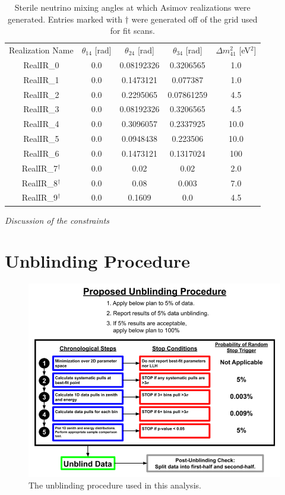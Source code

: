 \documentclass[main.tex]{subfiles}
\begin{document}
\begin{table}
    \centering
    \begin{tabular}{c | cccc}\rowcolor{blue!25}
            Realization Name & $\theta_{14}$ [rad] & $\theta_{24}$ [rad] & $\theta_{34}$ [rad] & $\Delta m_{41}^{2}$ [eV$^{2}$] \\
            RealIR\_0& 0.0  & 0.08192326 & 0.3206565 & 1.0 \\
            RealIR\_1& 0.0  & 0.1473121 & 0.077387 & 1.0\\
            RealIR\_2& 0.0  & 0.2295065 & 0.07861259 & 4.5\\
            RealIR\_3& 0.0  & 0.08192326 & 0.3206565 & 4.5\\
            RealIR\_4& 0.0  & 0.3096057 & 0.2337925 & 10.0\\
            RealIR\_5& 0.0  & 0.0948438 & 0.223506 & 10.0\\
            RealIR\_6& 0.0  & 0.1473121 & 0.1317024 & 100\\
            RealIR\_7$^{\dag}$ & 0.0  & 0.02 & 0.02 & 2.0\\
            RealIR\_8$^{\dag}$ & 0.0  & 0.08 & 0.003 & 7.0\\
            RealIR\_9$^{\dag}$ & 0.0  & 0.1609 & 0.0 & 4.5
    \end{tabular}
    \caption{Sterile neutrino mixing angles at which Asimov realizations were generated. Entries marked with $\dag$ were generated off of the grid used for fit scans.}\label{table:injected_signals}
\end{table}


\textit{Discussion of the constraints}

\section{Unblinding Procedure}

\begin{figure}
    \centering
    \includegraphics[width=0.7\linewidth]{figures/Proposed_unblinding_plan.jpg.png}
    \caption{The unblinding procedure used in this analysis.}\label{fig:unblind}
\end{figure}
\end{document}
